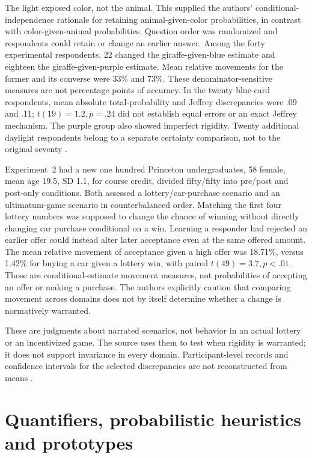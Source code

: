 The light exposed color, not the animal. This supplied the authors'
conditional-independence rationale for retaining animal-given-color
probabilities, in contrast with color-given-animal probabilities.
Question order was randomized and respondents could retain or change
an earlier answer. Among the forty experimental respondents, 22 changed
the giraffe-given-blue estimate and eighteen the giraffe-given-purple
estimate. Mean relative movements for the former and its converse were
33\% and 73\%. These denominator-sensitive measures are not percentage
points of accuracy. In the twenty blue-card respondents, mean absolute
total-probability and Jeffrey discrepancies were .09 and .11;
\(t(19)=1.2,p=.24\) did not establish equal errors or an exact
Jeffrey mechanism. The purple group also showed imperfect rigidity.
Twenty additional daylight respondents belong to a separate certainty
comparison, not to the original seventy
\cite[pp.~292--298]{ZhaoOsherson2010Jeffrey}.

Experiment~2 had a new one hundred Princeton undergraduates, 58 female,
mean age 19.5, SD 1.1, for course credit, divided fifty/fifty into
pre/post and post-only conditions. Both assessed a lottery/car-purchase
scenario and an ultimatum-game scenario in counterbalanced order.
Matching the first four lottery numbers was supposed to change the
chance of winning without directly changing car purchase conditional
on a win. Learning a responder had rejected an earlier offer could
instead alter later acceptance even at the same offered amount.
The mean relative movement of acceptance given a high offer was
18.71\%, versus 1.42\% for buying a car given a lottery win,
with paired \(t(49)=3.7,p<.01\). Those are conditional-estimate
movement measures, not probabilities of accepting an offer or making
a purchase. The authors explicitly caution that comparing movement
across domains does not by itself determine whether a change is
normatively warranted.

These are judgments about narrated scenarios, not behavior in an
actual lottery or an incentivized game. The source uses them to test
when rigidity is warranted; it does not support invariance in every
domain. Participant-level records and confidence intervals for the
selected discrepancies are not reconstructed from means
\cite[pp.~299--304]{ZhaoOsherson2010Jeffrey}.

\section{Quantifiers, probabilistic heuristics and prototypes}
\label{sec:p19-r45-quantifiers}

